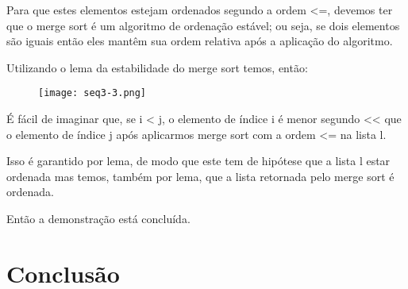 \documentclass[12pt]{article}
\begin{document}
Para que estes elementos estejam ordenados segundo a ordem <=, devemos ter que o merge sort é um algoritmo de ordenação estável; ou seja, se dois elementos são iguais então eles mantêm sua ordem relativa após a aplicação do algoritmo.

Utilizando o lema da estabilidade do merge sort temos, então:

\begin{figure}[H]
    \centering
    \texttt{[image: seq3-3.png]}
    \caption{}
    \label{}
\end{figure}

É fácil de imaginar que, se i < j, o elemento de índice i é menor segundo << que o elemento de índice j após aplicarmos merge sort com a ordem <= na lista l. 

Isso é garantido por lema, de modo que este tem de hipótese que a lista l estar ordenada mas temos, também por lema, que a lista retornada pelo merge sort é ordenada.

Então a demonstração está concluída.


\section{Conclusão}
\end{document}
